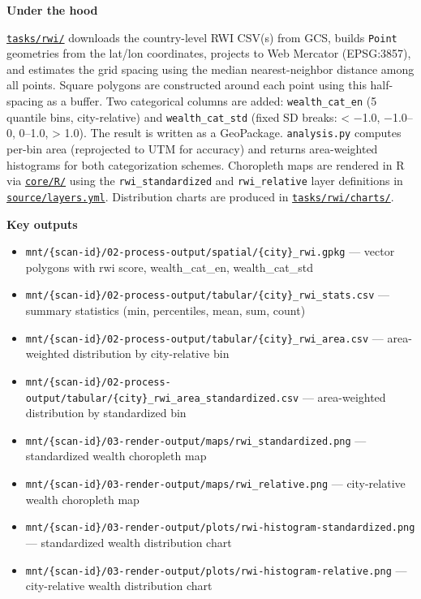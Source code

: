 \documentclass[
  letterpaper,
  DIV=11,
  numbers=noendperiod]{scrreprt}
\providecommand{\tightlist}{%
  \setlength{\itemsep}{0pt}\setlength{\parskip}{0pt}}
\begin{document}
\textbf{Under the hood}

\href{../tasks/rwi/}{\texttt{tasks/rwi/}} downloads the country-level
RWI CSV(s) from GCS, builds \texttt{Point} geometries from the lat/lon
coordinates, projects to Web Mercator (EPSG:3857), and estimates the
grid spacing using the median nearest-neighbor distance among all
points. Square polygons are constructed around each point using this
half-spacing as a buffer. Two categorical columns are added:
\texttt{wealth\_cat\_en} (5 quantile bins, city-relative) and
\texttt{wealth\_cat\_std} (fixed SD breaks: \textless{} −1.0, −1.0--0,
0--1.0, \textgreater{} 1.0). The result is written as a GeoPackage.
\texttt{analysis.py} computes per-bin area (reprojected to UTM for
accuracy) and returns area-weighted histograms for both categorization
schemes. Choropleth maps are rendered in R via
\href{../core/R/}{\texttt{core/R/}} using the \texttt{rwi\_standardized}
and \texttt{rwi\_relative} layer definitions in
\href{../source/layers.yml}{\texttt{source/layers.yml}}. Distribution
charts are produced in
\href{../tasks/rwi/charts/}{\texttt{tasks/rwi/charts/}}.

\textbf{Key outputs}

\begin{itemize}
\tightlist
\item
  \texttt{mnt/\{scan-id\}/02-process-output/spatial/\{city\}\_rwi.gpkg}
  --- vector polygons with rwi score, wealth\_cat\_en, wealth\_cat\_std
\item
  \texttt{mnt/\{scan-id\}/02-process-output/tabular/\{city\}\_rwi\_stats.csv}
  --- summary statistics (min, percentiles, mean, sum, count)
\item
  \texttt{mnt/\{scan-id\}/02-process-output/tabular/\{city\}\_rwi\_area.csv}
  --- area-weighted distribution by city-relative bin
\item
  \texttt{mnt/\{scan-id\}/02-process-output/tabular/\{city\}\_rwi\_area\_standardized.csv}
  --- area-weighted distribution by standardized bin
\item
  \texttt{mnt/\{scan-id\}/03-render-output/maps/rwi\_standardized.png}
  --- standardized wealth choropleth map
\item
  \texttt{mnt/\{scan-id\}/03-render-output/maps/rwi\_relative.png} ---
  city-relative wealth choropleth map
\item
  \texttt{mnt/\{scan-id\}/03-render-output/plots/rwi-histogram-standardized.png}
  --- standardized wealth distribution chart
\item
  \texttt{mnt/\{scan-id\}/03-render-output/plots/rwi-histogram-relative.png}
  --- city-relative wealth distribution chart
\end{itemize}
\end{document}

